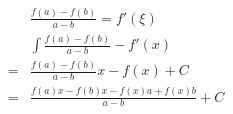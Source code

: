 \documentclass{article}
\begin{document}
  \begin{gather*}
  \end{gather*}
  \begin{align}
    \begin{aligned} %
      & \frac{f\left( a \right) - f\left(b\right)}{a - b} = f'\left( \xi  \right) \\
      & \int \frac{f\left( a \right) - f\left(b\right)}{a - b} - f'\left( x  \right) \\
      =& \frac{f\left( a \right) - f\left(b\right)}{a - b} x - f\left( x \right) + C \\
      =& \frac{f\left( a \right) x - f\left(b\right) x - f\left(x\right) a + f\left(x\right) b}{a - b} + C
    \end{aligned}
  \end{align}
\end{document}
